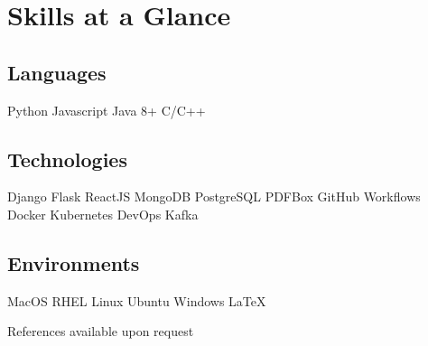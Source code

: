 \documentclass[]{resume-template}
\begin{document}


\section{Skills at a Glance}
\begin{multicols}{3}
\subsection{Languages}
Python  \textbullet{} Javascript \textbullet{} Java 8+ \textbullet{}   C/C++
\columnbreak

\subsection{Technologies}
Django \textbullet{} Flask \textbullet{} ReactJS \textbullet{} MongoDB \textbullet{} PostgreSQL \textbullet{} PDFBox \textbullet{} GitHub Workflows \textbullet{} Docker \textbullet{} Kubernetes \textbullet{} DevOps  \textbullet{}  Kafka
\columnbreak

\subsection{Environments}
MacOS  \textbullet{}  RHEL Linux \textbullet{} Ubuntu \textbullet{} Windows \textbullet{} \LaTeX  
\vspace{-1ex}
\end{multicols}
\sectionsep
\begin{center}
References available upon request
\end{center}

\end{document}
